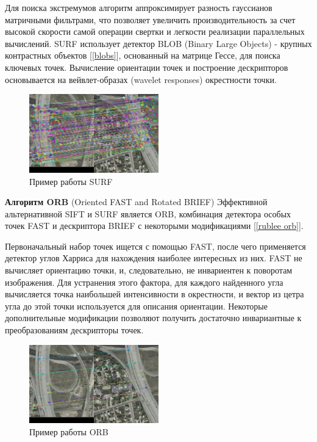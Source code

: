 {{		Для поиска экстремумов алгоритм аппроксимирует разность гауссианов матричными фильтрами, что позволяет увеличить производительность за счет высокой скорости самой операции свертки и легкости реализации параллельных вычислений. SURF использует детектор BLOB (Binary Large Objects) - крупных контрастных объектов [\ref{blobs}], основанный на матрице Гессе, для поиска ключевых точек.  Вычисление ориентации точек и построение дескрипторов основывается на вейвлет-образах (wavelet responses) окрестности точки.
		
		\begin{figure}[H]
			\centering                             
			\includegraphics[width=0.5\textwidth,keepaspectratio]{descriptors/surf.jpg}                 
			\centering\caption{ Пример работы SURF }
			\label{descriptors surf}                           
		\end{figure}    
		
		{\bf Алгоритм ORB} (Oriented FAST and Rotated BRIEF) Эффективной альтернативной SIFT и SURF является ORB, комбинация детектора особых точек FAST и дескриптора BRIEF с некоторыми модификациями [\ref{rublee orb}]. 
		
		Первоначальный набор точек ищется с помощью FAST, после чего применяется детектор углов Харриса для нахождения наиболее интересных из них. FAST не вычисляет ориентацию точки, и, следовательно, не инвариентен к поворотам изображения. Для устранения этого фактора, для каждого найденного угла вычисляется точка наибольшей интенсивности в окрестности, и вектор из цетра угла до этой точки используется для описания ориентации. Некоторые дополнительные модификации позволяют получить достаточно инвариантные к преобразованиям дескрипторы точек. 
		
		\begin{figure}[H]
			\centering                             
			\includegraphics[width=0.5\textwidth,keepaspectratio]{descriptors/orb.jpg}                 
			\centering\caption{ Пример работы ORB }
			\label{descriptors orb}                           
		\end{figure}    
		
}}
